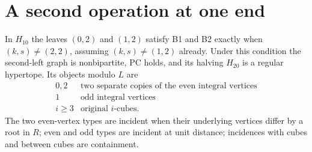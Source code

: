 \section{A second operation at one end}
\begin{proposition}\label{NI.second}
In $H_{10}$ the leaves $(0,2)$ and $(1,2)$ satisfy B1 and B2
exactly when $(k,s)\ne(2,2)$, assuming $(k,s)\ne(1,2)$ already.
Under this condition the second-left graph is nonbipartite, PC
holds, and its halving $H_{20}$ is a regular hypertope. Its objects
modulo $L$ are
\[
\begin{array}{c|l}
0,2&\text{two separate copies of the even integral vertices}\\
1&\text{odd integral vertices}\\
i\ge3&\text{original }i\text{-cubes}.
\end{array}
\]
The two even-vertex types are incident when their underlying vertices
differ by a root in $R$; even and odd types are incident at unit
distance; incidences with cubes and between cubes are containment.
\end{proposition}
